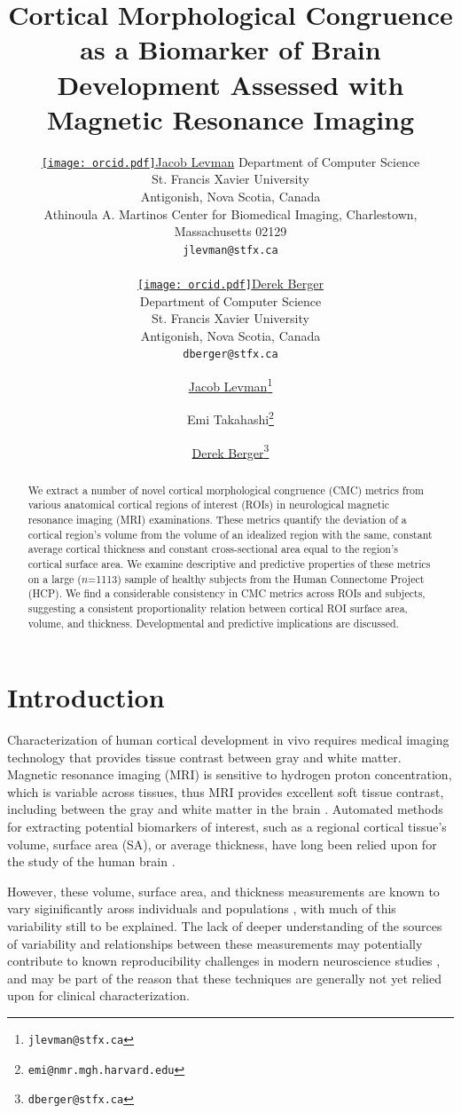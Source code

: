 \documentclass{article}
\title{Cortical Morphological Congruence as a Biomarker of Brain Development Assessed with Magnetic Resonance Imaging}
\author{%
	\href{https://orcid.org/0000-0002-9604-3157}{\texttt{[image: orcid.pdf]}\hspace{1mm}Jacob Levman}
	Department of Computer Science\\
	St. Francis Xavier University\\
	Antigonish, Nova Scotia, Canada\\
	Athinoula A. Martinos Center for Biomedical Imaging, Charlestown, Massachusetts 02129\\
	\texttt{jlevman@stfx.ca} \\

	\And

	\href{https://orcid.org/0000-0003-4733-0624}{\texttt{[image: orcid.pdf]}\hspace{1mm}Derek Berger} \\
	Department of Computer Science\\
	St. Francis Xavier University\\
	Antigonish, Nova Scotia, Canada\\
	\texttt{dberger@stfx.ca} \\
}
\author[1,2,3,4]{%
	\href{https://orcid.org/0000-0002-9604-3157}{\usebox{\orcid}\hspace{1mm}Jacob Levman\thanks{\texttt{jlevman@stfx.ca}}}%
}
\author[1,4]{%
	Emi Takahashi\thanks{\texttt{emi@nmr.mgh.harvard.edu}}%
}
\author[1]{%
	\href{https://orcid.org/0000-0003-4733-0624}{\usebox{\orcid}\hspace{1mm}Derek Berger\thanks{\texttt{dberger@stfx.ca}}}%
}
\affil[1]{Athinoula A. Martinos Center for Biomedical Imaging, Charlestown, Massachusetts 02129}
\affil[2]{Department of Computer Science, St. Francis Xavier University,Antigonish, Nova Scotia}
\affil[3]{Nova Scotia Health Authority, Halifax, NS, Canada}
\affil[4]{Harvard Medical School, Department of Radiology, Boston, MA, USA.}
\begin{document}
\maketitle

\begin{abstract}
We extract a number of novel cortical morphological congruence (CMC) metrics
from various anatomical cortical regions of interest (ROIs) in neurological
magnetic resonance imaging (MRI) examinations. These metrics quantify the
deviation of a cortical region's volume from the volume of an idealized
region with the same, constant average cortical thickness and constant
cross-sectional area equal to the region's cortical surface area. We examine
descriptive and predictive properties of these metrics on a large
(\(n\)=1113) sample of healthy subjects from the Human Connectome Project
(HCP). We find a considerable consistency in CMC metrics across ROIs and
subjects, suggesting a consistent proportionality relation between cortical
ROI surface area, volume, and thickness. Developmental and predictive
implications are discussed.
\end{abstract}




\section{Introduction} \label{intro}

Characterization of human cortical development in vivo requires medical
imaging technology that provides tissue contrast between gray and white
matter. Magnetic resonance imaging (MRI) is sensitive to hydrogen proton
concentration, which is variable across tissues, thus MRI provides excellent
soft tissue contrast, including between the gray and white matter in the
brain \citep{duboisMRINeonatalBrain2021}. Automated methods for extracting
potential biomarkers of interest, such as a regional cortical tissue's
volume, surface area (SA), or average thickness, have long been relied upon for
the study of the human brain
\citep{fischlFreeSurfer2012,levmanPediatricStructuralMRI2017,levmanStructuralMagneticResonance2019a,mccannStructuralMagneticResonance2021}.

However, these volume, surface area, and thickness measurements are known to
vary siginificantly aross individuals and populations
\citep{fischlFreeSurfer2012,levmanPediatricStructuralMRI2017,levmanStructuralMagneticResonance2019a},
with much of this variability still to be explained. The lack of deeper
understanding of the sources of variability and relationships between these
measurements may potentially contribute to known reproducibility challenges
in modern neuroscience studies
\citep{martinezReproducibilityBraincognitionRelationships2015,marekReproducibleBrainwideAssociation2022},
and may be part of the reason that these techniques are generally not yet
relied upon for clinical characterization.
\end{document}
